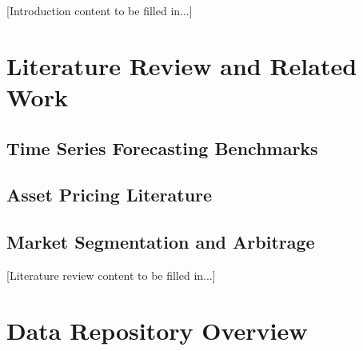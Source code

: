 \documentclass{article}
\begin{document}
[Introduction content to be filled in...]

\section{Literature Review and Related Work}
\label{sec:literature}


\subsection{Time Series Forecasting Benchmarks}

\subsection{Asset Pricing Literature}

\subsection{Market Segmentation and Arbitrage}

[Literature review content to be filled in...]

\section{Data Repository Overview}
\label{sec:repository_overview}

\end{document}
